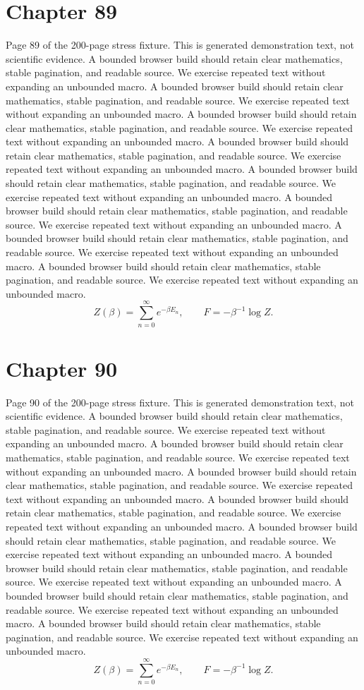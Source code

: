 \documentclass[11pt]{article}
\begin{document}
\section*{Chapter 89}
Page 89 of the 200-page stress fixture. This is generated demonstration text, not scientific evidence.
A bounded browser build should retain clear mathematics, stable pagination, and readable source. We exercise repeated text without expanding an unbounded macro.
A bounded browser build should retain clear mathematics, stable pagination, and readable source. We exercise repeated text without expanding an unbounded macro.
A bounded browser build should retain clear mathematics, stable pagination, and readable source. We exercise repeated text without expanding an unbounded macro.
A bounded browser build should retain clear mathematics, stable pagination, and readable source. We exercise repeated text without expanding an unbounded macro.
A bounded browser build should retain clear mathematics, stable pagination, and readable source. We exercise repeated text without expanding an unbounded macro.
A bounded browser build should retain clear mathematics, stable pagination, and readable source. We exercise repeated text without expanding an unbounded macro.
A bounded browser build should retain clear mathematics, stable pagination, and readable source. We exercise repeated text without expanding an unbounded macro.
A bounded browser build should retain clear mathematics, stable pagination, and readable source. We exercise repeated text without expanding an unbounded macro.
\[Z(\beta)=\sum_{n=0}^{\infty}e^{-\beta E_n},\qquad F=-\beta^{-1}\log Z.\]
\newpage
\section*{Chapter 90}
Page 90 of the 200-page stress fixture. This is generated demonstration text, not scientific evidence.
A bounded browser build should retain clear mathematics, stable pagination, and readable source. We exercise repeated text without expanding an unbounded macro.
A bounded browser build should retain clear mathematics, stable pagination, and readable source. We exercise repeated text without expanding an unbounded macro.
A bounded browser build should retain clear mathematics, stable pagination, and readable source. We exercise repeated text without expanding an unbounded macro.
A bounded browser build should retain clear mathematics, stable pagination, and readable source. We exercise repeated text without expanding an unbounded macro.
A bounded browser build should retain clear mathematics, stable pagination, and readable source. We exercise repeated text without expanding an unbounded macro.
A bounded browser build should retain clear mathematics, stable pagination, and readable source. We exercise repeated text without expanding an unbounded macro.
A bounded browser build should retain clear mathematics, stable pagination, and readable source. We exercise repeated text without expanding an unbounded macro.
A bounded browser build should retain clear mathematics, stable pagination, and readable source. We exercise repeated text without expanding an unbounded macro.
\[Z(\beta)=\sum_{n=0}^{\infty}e^{-\beta E_n},\qquad F=-\beta^{-1}\log Z.\]
\newpage
\end{document}
